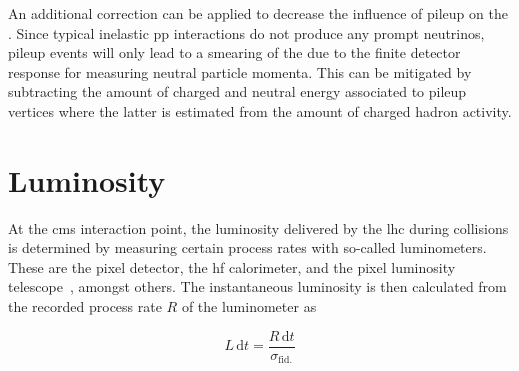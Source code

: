 
An additional correction can be applied to decrease the influence of pileup on the \met. Since typical inelastic pp interactions do not produce any prompt neutrinos, pileup events will only lead to a smearing of the \met due to the finite detector response for measuring neutral particle momenta. This can be mitigated by subtracting the amount of charged and neutral energy associated to pileup vertices where the latter is estimated from the amount of charged hadron activity.


\section{Luminosity}

At the \gls{cms} interaction point, the luminosity delivered by the \gls{lhc} during collisions is determined by measuring certain process rates with so-called luminometers. These are the pixel detector, the \gls{hf} calorimeter, and the pixel luminosity telescope~\cite{Kornmayer:2039978}, amongst others. The instantaneous luminosity is then calculated from the recorded process rate $R$ of the luminometer as

\begin{equation}
L\,\mathrm{d}t=\frac{R\,\mathrm{d}t}{\sigma_\mathrm{fid.}}
\end{equation}

